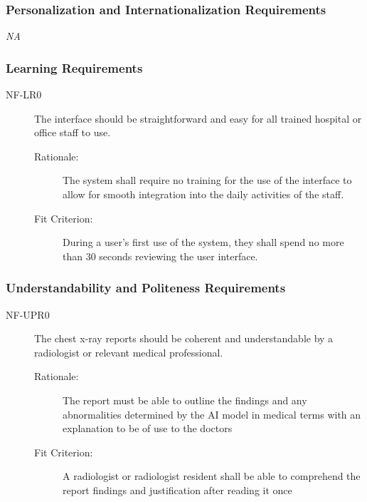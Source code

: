 \documentclass[12pt]{article}
\begin{document}
\subsubsection{Personalization and Internationalization Requirements}
\textit{NA}

\subsubsection{Learning Requirements}
\begin{description}
    \item[NF-LR0] The interface should be straightforward and easy for all trained hospital or office staff to use.  
    \begin{description}
        \item[Rationale:] The system shall require no training for the use of the interface to allow for smooth integration into the daily activities of the staff.
        \item[Fit Criterion:] During a user's first use of the system, they shall spend no more than 30 seconds reviewing the user interface.
    \end{description}
\end{description}


\subsubsection{Understandability and Politeness Requirements}
\begin{description}
    \item[NF-UPR0] The chest x-ray reports should be coherent and understandable by a radiologist or relevant medical professional. 
    \begin{description}
        \item[Rationale:] The report must be able to outline the findings and any abnormalities determined by the AI model in medical terms with an explanation to be of use to the doctors
        \item[Fit Criterion:] A radiologist or radiologist resident shall be able to comprehend the report findings and justification after reading it once
    \end{description}
\end{description}
\end{document}
